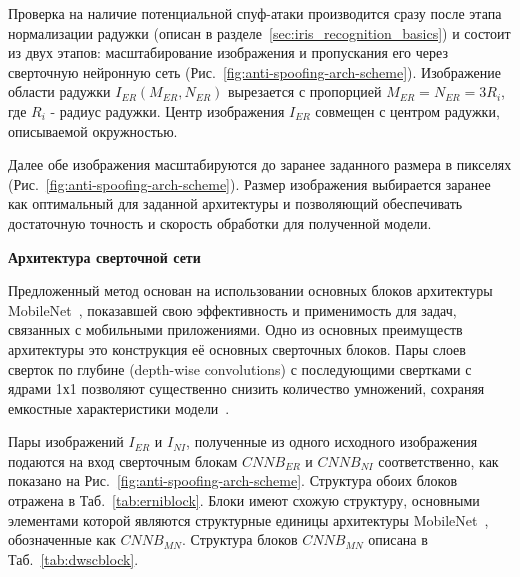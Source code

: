 Проверка на наличие потенциальной спуф-атаки производится сразу после этапа нормализации радужки (описан в разделе~\ref{sec:iris_recognition_basics}) и состоит из двух этапов: масштабирование изображения и пропускания его через сверточную нейронную сеть (Рис.~\ref{fig:anti-spoofing-arch-scheme}). Изображение области радужки $I_{ER}(M_{ER},N_{ER})$ вырезается с пропорцией $M_{ER}=N_{ER}=3R_i$, где $R_i$ - радиус радужки. Центр изображения $I_{ER}$ совмещен с центром радужки, описываемой окружностью.

Далее обе изображения масштабируются до заранее заданного размера в пикселях (Рис.~\ref{fig:anti-spoofing-arch-scheme}). Размер изображения выбирается заранее как оптимальный для заданной архитектуры и позволяющий обеспечивать достаточную точность и скорость обработки для полученной модели.

{\bf Архитектура сверточной сети}
\label{sec:proposed-anti-spoofing-architecture}

Предложенный метод основан на использовании основных блоков архитектуры MobileNet~\cite{howard_2017}, показавшей свою эффективность и применимость для задач, связанных с мобильными приложениями. Одно из основных преимуществ архитектуры это конструкция её основных сверточных блоков. Пары слоев сверток по глубине (depth-wise convolutions) с последующими свертками с ядрами 1х1 позволяют существенно снизить количество умножений, сохраняя емкостные характеристики модели~\cite{howard_2017}.

Пары изображений $I_{ER}$ и $I_{NI}$, полученные из одного исходного изображения подаются на вход сверточным блокам $CNNB_{ER}$ и $CNNB_{NI}$ соответственно, как показано на Рис.~\ref{fig:anti-spoofing-arch-scheme}. Структура обоих блоков отражена в Таб.~\ref{tab:erniblock}. Блоки имеют схожую структуру, основными элементами которой являются структурные единицы архитектуры MobileNet~\cite{howard_2017}, обозначенные как $CNNB_{MN}$. Структура блоков $CNNB_{MN}$ описана в Таб.~\ref{tab:dwscblock}.

